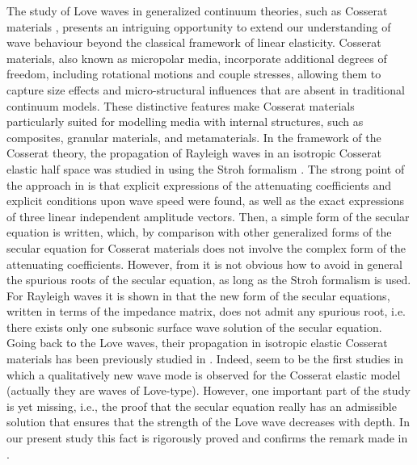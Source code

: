 \documentclass[10pt]{article}
\begin{document}
 The study of Love waves  in generalized continuum theories, such as Cosserat materials \cite{Cosserat09,Eringen64,Mindlin64,Eringen99}, presents an intriguing opportunity to extend our understanding of wave behaviour beyond the classical framework of  {linear} elasticity. Cosserat materials, also known as micropolar media, incorporate additional degrees of freedom, including rotational motions and couple stresses, allowing them to capture size effects and micro-structural influences that are absent in traditional continuum models. These distinctive features make Cosserat materials particularly suited for modelling media with internal structures, such as composites, granular materials, and metamaterials. In the framework of the Cosserat theory, the  propagation of Rayleigh waves in an isotropic Cosserat elastic half space  was studied in \cite{ChiritaGhiba3} using  the Stroh formalism \cite{destrade2007seismic,stroh1962steady}.  The strong point of the approach  in \cite{ChiritaGhiba3}  is that  explicit
 expressions of the attenuating coefficients and explicit conditions upon wave
 speed were found, as well as the exact expressions of three linear independent
 amplitude vectors. Then,  a simple form of the secular
 equation is written, which,  by comparison  with other
 generalized forms of the secular equation for Cosserat materials {\cite{Eringen99,Kulesh01,Kulesh03,Kulesh05,Erofeyev,Koebke}}  does not involve the complex form of
 the attenuating coefficients. However, from \cite{ChiritaGhiba3}  it is not obvious how to avoid in  {general} the spurious roots of the secular equation, as long as the Stroh formalism is used.  For Rayleigh waves it is shown in   \cite{khan2022existence} that the new form of the secular equations, written in terms of the impedance matrix, does not admit any spurious root, i.e. there exists only one subsonic surface wave solution of the secular equation.   {Going back to the Love waves, their propagation in isotropic elastic Cosserat materials has been previously  studied in \cite{kundu2017love,kulesh2009problem,Kulesh1,Kulesh2}. 
 Indeed,  \cite{kulesh2009problem,Kulesh1,Kulesh2} seem to be the  first studies in which  a qualitatively new wave mode  is observed  for the Cosserat elastic model (actually they are waves of  Love-type).  
 However,  one important part of the study is yet missing, i.e., the proof that the secular equation really has  {an} admissible solution that ensures that the  {strength of} the Love wave decreases with depth. In our present study this fact is rigorously proved and confirms the remark made in \cite{kulesh2009problem,Kulesh1,Kulesh2}.}
\end{document}
